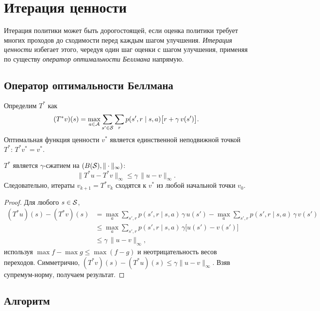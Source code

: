 \section{Итерация ценности}
\label{sec:value-iteration}

Итерация политики может быть дорогостоящей, если оценка политики требует многих проходов до сходимости перед каждым шагом улучшения.  \emph{Итерация ценности} избегает этого, чередуя один шаг оценки с шагом улучшения, применяя по существу \emph{оператор оптимальности Беллмана} напрямую.

\subsection*{Оператор оптимальности Беллмана}

Определим $T^*$ как
\begin{equation}
\label{eq:bellman-optimality-op}
(T^* v)(s) = \max_{a \in \mathcal{A}} \sum_{s' \in \mathcal{S}}\sum_r p(s',r \mid s,a)\bigl[r + \gamma\, v(s')\bigr].
\end{equation}
Оптимальная функция ценности $v^*$ является единственной неподвижной точкой $T^*$: $T^* v^* = v^*$.

\begin{theorem}[Сжатие $T^*$]
\label{thm:tstar-contraction}
$T^*$ является $\gamma$-сжатием на $(B(\mathcal{S}), \|\cdot\|_\infty)$:
\[
\|T^* u - T^* v\|_\infty \le \gamma\,\|u - v\|_\infty.
\]
Следовательно, итераты $v_{k+1} = T^* v_k$ сходятся к $v^*$ из любой начальной точки $v_0$.
\end{theorem}

\begin{proof}
Для любого $s \in \mathcal{S}$,
\begin{align*}
(T^* u)(s) - (T^* v)(s)
&= \max_a \sum_{s',r} p(s',r\mid s,a)\,\gamma\, u(s')
- \max_a \sum_{s',r} p(s',r\mid s,a)\,\gamma\, v(s') \\
&\le \max_a \sum_{s',r} p(s',r\mid s,a)\,\gamma\bigl[u(s') - v(s')\bigr] \\
&\le \gamma\,\|u - v\|_\infty,
\end{align*}
используя $\max f - \max g \le \max(f - g)$ и неотрицательность весов переходов.  Симметрично, $(T^* v)(s) - (T^* u)(s) \le \gamma\|u-v\|_\infty$.  Взяв супремум-норму, получаем результат.
\end{proof}

\subsection*{Алгоритм}

